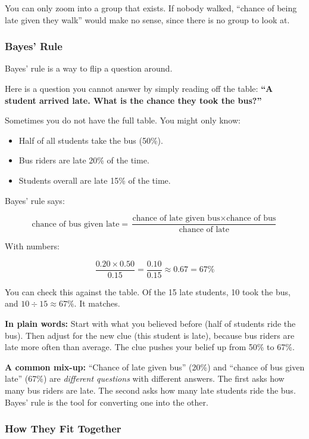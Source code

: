 You can only zoom into a group that exists. If nobody walked, ``chance of being late given they walk'' would make no sense, since there is no group to look at.

\subsubsection*{Bayes' Rule}

Bayes' rule is a way to flip a question around.

Here is a question you cannot answer by simply reading off the table: \textbf{``A student arrived late. What is the chance they took the bus?''}

Sometimes you do not have the full table. You might only know:

\begin{itemize}
  \item Half of all students take the bus (50\%).
  \item Bus riders are late 20\% of the time.
  \item Students overall are late 15\% of the time.
\end{itemize}

Bayes' rule says:

\[
\text{chance of bus given late} =
\frac{\text{chance of late given bus} \times \text{chance of bus}}
     {\text{chance of late}}
\]

With numbers:

\[
\frac{0.20 \times 0.50}{0.15} = \frac{0.10}{0.15} \approx 0.67 = 67\%
\]

You can check this against the table. Of the 15 late students, 10 took the bus, and $10 \div 15 \approx 67\%$. It matches.

\textbf{In plain words:} Start with what you believed before (half of students ride the bus). Then adjust for the new clue (this student is late), because bus riders are late more often than average. The clue pushes your belief up from 50\% to 67\%.

\textbf{A common mix-up:} ``Chance of late given bus'' (20\%) and ``chance of bus given late'' (67\%) are \textit{different questions} with different answers. The first asks how many bus riders are late. The second asks how many late students ride the bus. Bayes' rule is the tool for converting one into the other.

\subsubsection*{How They Fit Together}

